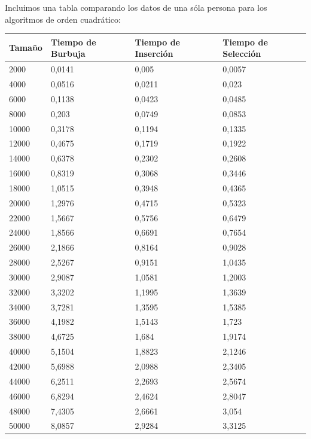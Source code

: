 \documentclass[a4paper, 11pt]{article}
\begin{document}
\noindent Incluimos una tabla comparando los datos de una sóla persona para los algoritmos de orden cuadrático: \\

\begin{tabular}{|l|l|l|l|}
	\hline
	Tamaño &Tiempo de Burbuja &Tiempo de  Inserción &Tiempo de  Selección \\
	\hline
	\hline
	2000 & 0,0141 & 0,005 & 0,0057 \\
	\hline
	4000 & 0,0516 & 0,0211 & 0,023 \\
	\hline
	6000 & 0,1138 & 0,0423 & 0,0485 \\
	\hline
	8000 & 0,203 & 0,0749 & 0,0853 \\
	\hline
	10000 & 0,3178 & 0,1194 & 0,1335 \\
	\hline
	12000 & 0,4675 & 0,1719 & 0,1922 \\
	\hline
	14000 & 0,6378 & 0,2302 & 0,2608 \\
	\hline
	16000 & 0,8319 & 0,3068 & 0,3446 \\
	\hline
	18000 & 1,0515 & 0,3948 & 0,4365 \\
	\hline
	20000 & 1,2976 & 0,4715 & 0,5323 \\
	\hline
	22000 & 1,5667 & 0,5756 & 0,6479 \\
	\hline
	24000 & 1,8566 & 0,6691 & 0,7654 \\
	\hline
	26000 & 2,1866 & 0,8164 & 0,9028 \\
	\hline
	28000 & 2,5267 & 0,9151 & 1,0435 \\
	\hline
	30000 & 2,9087 & 1,0581 & 1,2003 \\
	\hline
	32000 & 3,3202 & 1,1995 & 1,3639 \\
	\hline
	34000 & 3,7281 & 1,3595 & 1,5385 \\
	\hline
	36000 & 4,1982 & 1,5143 & 1,723 \\
	\hline
	38000 & 4,6725 & 1,684 & 1,9174 \\
	\hline
	40000 & 5,1504 & 1,8823 & 2,1246 \\
	\hline
	42000 & 5,6988 & 2,0988 & 2,3405 \\
	\hline
	44000 & 6,2511 & 2,2693 & 2,5674 \\
	\hline
	46000 & 6,8294 & 2,4624 & 2,8047 \\
	\hline
	48000 & 7,4305 & 2,6661 & 3,054 \\
	\hline
	50000 & 8,0857 & 2,9284 & 3,3125 \\
	\hline
\end{tabular}
\end{document}
